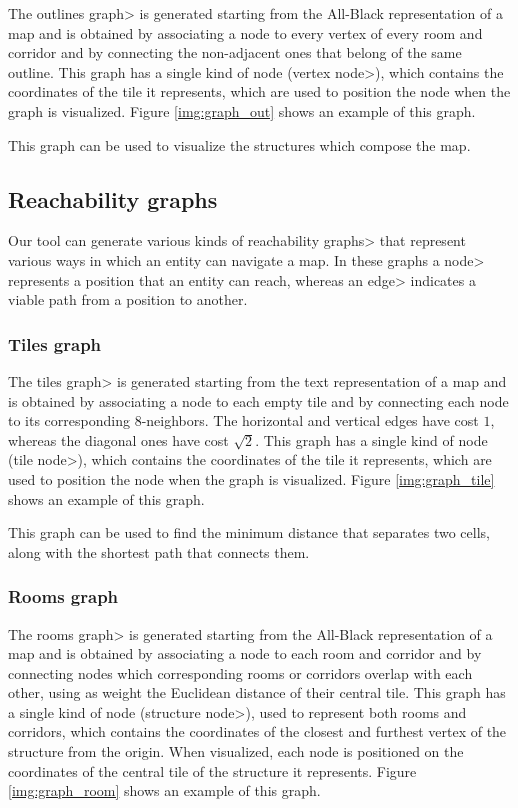 The \<outlines graph> is generated starting from the All-Black representation of a map and is obtained by associating a node to every vertex of every room and corridor and by connecting the non-adjacent ones that belong of the same outline. This graph has a single kind of node (\<vertex node>), which contains the coordinates of the tile it represents, which are used to position the node when the graph is visualized. Figure \ref{img:graph_out} shows an example of this graph.

\par

This graph can be used to visualize the structures which compose the map.

\subsection{Reachability graphs}

Our tool can generate various kinds of \<reachability graphs> that represent various ways in which an entity can navigate a map. In these graphs a \<node> represents a position that an entity can reach, whereas an \<edge> indicates a viable path from a position to another.

\subsubsection{Tiles graph}

The \<tiles graph> is generated starting from the text representation of a map and is obtained by associating a node to each empty tile and by connecting each node to its corresponding 8-neighbors. The horizontal and vertical edges have cost $1$, whereas the diagonal ones have cost $\sqrt{2}$. This graph has a single kind of node (\<tile node>), which contains the coordinates of the tile it represents, which are used to position the node when the graph is visualized. Figure \ref{img:graph_tile} shows an example of this graph.

\par

This graph can be used to find the minimum distance that separates two cells, along with the shortest path that connects them.

\subsubsection{Rooms graph}

The \<rooms graph> is generated starting from the All-Black representation of a map and is obtained by associating a node to each room and corridor and by connecting nodes which corresponding rooms or corridors overlap with each other, using as weight the Euclidean distance of their central tile. This graph has a single kind of node (\<structure node>), used to represent both rooms and corridors, which contains the coordinates of the closest and furthest vertex of the structure from the origin. When visualized, each node is positioned on the coordinates of the central tile of the structure it represents. Figure \ref{img:graph_room} shows an example of this graph.

